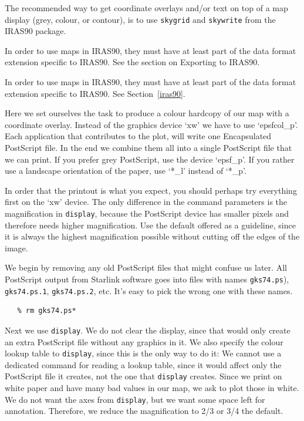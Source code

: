 \documentclass[11pt]{article}
\newenvironment{latexonly}{}{}
\newcommand{\htmlref}[2]{#1}
\newcommand{\xref}[3]{#1}
\begin{document}
   The recommended way to get coordinate overlays and/or text on top of
   a map display (grey, colour, or contour), is to use
{\tt \xref{skygrid}{sun163}{SKYGRID}}
   and
{\tt \xref{skywrite}{sun163}{SKYWRITE}}
   from the
\xref{IRAS90}{sun163}{}
   package.

\begin{htmlonly}
   In order to use maps in IRAS90, they must have at least part
   of the data format extension specific to IRAS90. See the section on
\htmlref{Exporting to IRAS90.}{iras90}
\end{htmlonly}
\begin{latexonly}
   In order to use maps in IRAS90, they must have at least part
   of the data format extension specific to IRAS90. See
Section~\ref{iras90}.
\end{latexonly}

   Here we set ourselves the task to produce a colour hardcopy of our
   map with a coordinate overlay. Instead of the graphics device `xw' we
   have to use `epsfcol\_p'. Each application that contributes to the
   plot, will write one Encapsulated PostScript file. In the end we
   combine them all into a single PostScript file that we can print. If
   you prefer grey PostScript, use the device `epsf\_p'. If you rather
   use a landscape orientation of the paper, use `*\_l' instead of `*\_p'.

   In order that the printout is what you expect, you should perhaps try
   everything first on the `xw' device. The only difference in the
   command parameters is the magnification in
{\tt \xref{display}{sun95}{DISPLAY}},
   because
   the PostScript device has smaller pixels and therefore needs higher
   magnification. Use the default offered as a guideline, since it is
   always the highest magnification possible without cutting off the
   edges of the image.

   We begin by removing any old PostScript files that might confuse us
   later. All PostScript output from Starlink software goes into files
   with names {\tt gks74.ps}), {\tt gks74.ps.1}, {\tt gks74.ps.2},
   etc. It's easy to pick the wrong one with these names.

\begin{verbatim}
   % rm gks74.ps*
\end{verbatim}

   Next we use {\tt display}. We do not clear the display, since that
   would only create an extra PostScript file without any graphics in
   it. We also specify the colour lookup table to {\tt display},
   since this is the only way to do it: We cannot use a dedicated
   command for reading a lookup table, since it would affect only the
   PostScript file it creates,
   not the one that {\tt display} creates. Since we print on white
   paper and have many bad values in our map, we ask to plot those in
   white. We do not want the axes from {\tt display}, but we want
   some space left for annotation. Therefore, we reduce the
   magnification to 2/3 or 3/4 the default.
\end{document}
